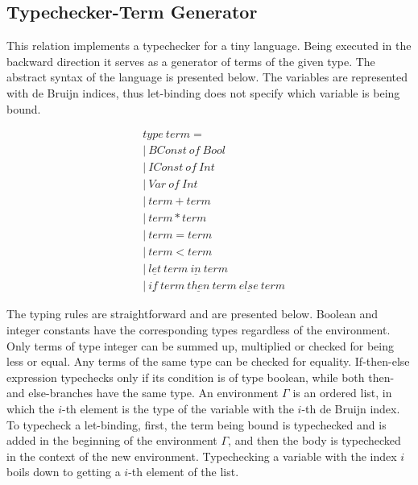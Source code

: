 \subsection{Typechecker-Term Generator}

This relation implements a typechecker for a tiny language.
Being executed in the backward direction it serves as a generator of terms of the given type.
The abstract syntax of the language is presented below.
The variables are represented with de Bruijn indices, thus let-binding does not specify which variable is being bound.



\begin{align*}
  &type \ term = \\
  &| \ BConst \ of \ Bool \\
  &| \ IConst \ of \ Int \\
  &| \ Var \ of \ Int \\
  &| \ term + term \\
  &| \ term * term \\
  &| \ term = term \\
  &| \ term < term \\
  &| \ \underline{let} \ term \ \underline{in} \ term \\
  &| \ \underline{if} \ term \ \underline{then} \ term \ \underline{else} \ term
\end{align*}


The typing rules are straightforward and are presented below.
Boolean and integer constants have the corresponding types regardless of the environment.
Only terms of type integer can be summed up, multiplied or checked for being less or equal.
Any terms of the same type can be checked for equality.
If-then-else expression typechecks only if its condition is of type boolean, while both then- and else-branches have the same type.
An environment $\Gamma$ is an ordered list, in which the $i$-th element is the type of the variable with the $i$-th de Bruijn index.
To typecheck a let-binding, first, the term being bound is typechecked and is added in the beginning of the environment $\Gamma$, and then the body is typechecked in the context of the new environment.
Typechecking a variable with the index $i$ boils down to getting a $i$-th element of the list.

